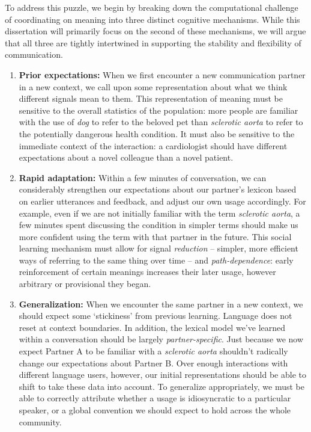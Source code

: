 To address this puzzle, we begin by breaking down the computational challenge of coordinating on meaning into three distinct cognitive mechanisms.
While this dissertation will primarily focus on the second of these mechanisms, we will argue that all three are tightly intertwined in supporting the stability and flexibility of communication.
\begin{enumerate}
\item \textbf{Prior expectations:} When we first encounter a new communication partner in a new context, we call upon some representation about what we think different signals mean to them. This representation of meaning must be sensitive to the overall statistics of the population: more people are familiar with the use of \emph{dog} to refer to the beloved pet than \emph{sclerotic aorta} to refer to the potentially dangerous health condition. It must also be sensitive to the immediate context of the interaction: a cardiologist should have different expectations about a novel colleague than a novel patient.
\item \textbf{Rapid adaptation:} Within a few minutes of conversation, we can considerably strengthen our expectations about our partner's lexicon based on earlier utterances and feedback, and adjust our own usage accordingly. For example, even if we are not initially familiar with the term \emph{sclerotic aorta}, a few minutes spent discussing the condition in simpler terms should make us more confident using the term with that partner in the future. This social learning mechanism must allow for signal \emph{reduction} -- simpler, more efficient ways of referring to the same thing over time -- and \emph{path-dependence}: early reinforcement of certain meanings increases their later usage, however arbitrary or provisional they began. 
\item \textbf{Generalization:} When we encounter the same partner in a new context, we should expect some `stickiness' from previous learning. Language does not reset at context boundaries. In addition, the lexical model we've learned within a conversation should be largely \emph{partner-specific}. Just because we now expect Partner A to be familiar with a \emph{sclerotic aorta} shouldn't radically change our expectations about Partner B. Over enough interactions with different language users, however, our initial representations should be able to shift to take these data into account. To generalize appropriately, we must be able to correctly attribute whether a usage is idiosyncratic to a particular speaker, or a global convention we should expect to hold across the whole community.
\end{enumerate}

